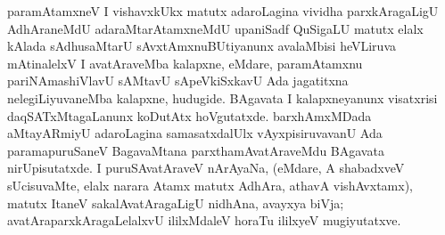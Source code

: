 paramAtamxneV I vishavxkUkx matutx adaroLagina vividha parxkAragaLigU AdhAra\-neMdU adaraMtarAtamxneMdU upaniSadf QuSigaLU matutx elalx kAlada sAdhusaMtarU sAvxtAmxnuBUtiyanunx avalaMbisi heVLiruva mAtinalelxV I avatAraveMba kalapxne, eMdare, paramAtamxnu pariNAmashiVlavU sAMtavU sApeVkiSxkavU Ada jagatitxna nele\-giLiyuvaneMba kalapxne, hudugide. BAgavata I kalapxneyanunx visatxrisi daqSATxMtagaLanunx koDutAtx hoVgutatxde. barxhAmxMDada aMtayARmiyU adaroLagina samasatxdalUlx vAyxpisiruvavanU Ada paramapuruSaneV BagavaMtana parxthamAvatAraveMdu BAgavata nirUpisutatxde. I puruSAvatAraveV nArAyaNa, (eMdare, A shabadxveV sUcisuvaMte, elalx narara Atamx matutx AdhAra, athavA vishAvxtamx), matutx ItaneV sakalAvatAragaLigU nidhAna, avayxya biVja; avatAraparxkAragaLelalxvU ililxMdaleV horaTu ililxyeV mugiyutatxve.

